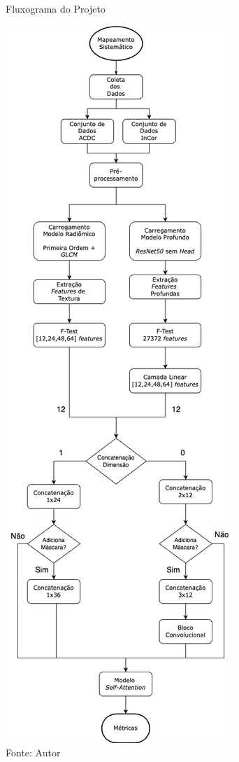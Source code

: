 \begin{figure}[h!]
    \centering
    \caption{Fluxograma do Projeto}
    \includegraphics[scale=0.44]{figures/fig015.png}
    \caption*{Fonte: Autor}
    \label{fig:fig015}
\end{figure}

